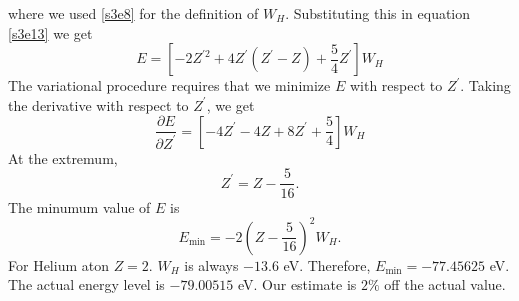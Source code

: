 \documentclass{article}
\numberwithin{equation}{section}
\begin{document}
where we used \eqref{s3e8} for the definition of $W_H$. Substituting this in
equation \eqref{s3e13} we get
\begin{equation}\label{s3e19}
E = \left[-2Z^{\prime 2} + 4Z^\prime(Z^\prime - Z) + \frac{5}{4}Z^\prime\right]W_H
\end{equation}
The variational procedure requires that we minimize $E$ with respect to $Z^\prime$.
Taking the derivative with respect to $Z^\prime$, we get
\[
\frac{\partial E}{\partial Z^\prime} = \left[-4Z^\prime - 4Z + 8Z^\prime + \frac{5}{4}\right]W_H
\]
At the extremum,
\begin{equation}\label{s3e20}
Z^\prime = Z - \frac{5}{16}.
\end{equation}
The minumum value of $E$ is
\begin{equation}\label{s3e21}
E_{\text{min}} = -2\left(Z - \frac{5}{16}\right)^2W_H.
\end{equation}
For Helium aton $Z = 2$. $W_H$ is always $-13.6$ eV. Therefore, $E_{\text{min}} 
= -77.45625$ eV. The actual energy level is $-79.00515$ eV. Our estimate is
$2\%$ off the actual value.
\end{document}
